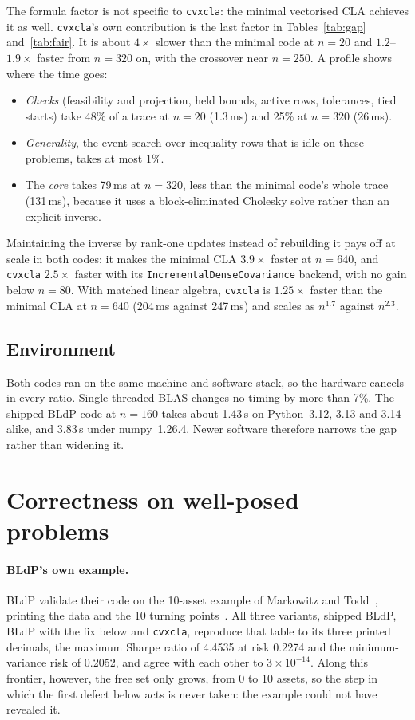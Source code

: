 \documentclass[11pt,a4paper]{article}
\newcommand{\code}[1]{\texttt{#1}}
\newcommand{\cvxcla}{\code{cvxcla}}
\begin{document}
The formula factor is not specific to \cvxcla{}: the minimal vectorised CLA
achieves it as well. \cvxcla{}'s own contribution is the last factor in
Tables~\ref{tab:gap} and~\ref{tab:fair}. It is about $4\times$ slower than the
minimal code at $n = 20$ and $1.2$--$1.9\times$ faster from $n = 320$ on, with
the crossover near $n = 250$. A profile shows where the time goes:

\begin{itemize}
  \item \emph{Checks} (feasibility and projection, held bounds, active rows,
    tolerances, tied starts) take 48\% of a trace at $n = 20$ (1.3\,ms) and
    25\% at $n = 320$ (26\,ms).
  \item \emph{Generality}, the event search over inequality rows that is idle
    on these problems, takes at most 1\%.
  \item The \emph{core} takes 79\,ms at $n = 320$, less than the minimal
    code's whole trace (131\,ms), because it uses a block-eliminated Cholesky
    solve rather than an explicit inverse.
\end{itemize}

Maintaining the inverse by rank-one updates instead of rebuilding it pays off
at scale in both codes: it makes the minimal CLA $3.9\times$ faster at
$n = 640$, and \cvxcla{} $2.5\times$ faster with its
\code{IncrementalDenseCovariance} backend, with no gain below $n = 80$. With
matched linear algebra, \cvxcla{} is $1.25\times$ faster than the minimal CLA
at $n = 640$ (204\,ms against 247\,ms) and scales as $n^{1.7}$ against
$n^{2.3}$.

\subsection{Environment}

Both codes ran on the same machine and software stack, so the hardware cancels
in every ratio. Single-threaded BLAS changes no timing by more than 7\%. The
shipped BLdP code at $n = 160$ takes about 1.43\,s on Python~3.12, 3.13 and
3.14 alike, and 3.83\,s under numpy~1.26.4. Newer software therefore narrows
the gap rather than widening it.

\section{Correctness on well-posed problems}\label{sec:correctness}

\paragraph{BLdP's own example.} BLdP validate their code on the 10-asset
example of Markowitz and Todd~\cite{markowitz2000}, printing the data and the
10 turning points~\cite[Tables~1--2]{bailey2013}. All three variants, shipped
BLdP, BLdP with the fix below and \cvxcla{}, reproduce that table to its three
printed decimals, the maximum Sharpe ratio of 4.4535 at risk 0.2274 and the
minimum-variance risk of 0.2052, and agree with each other to
$3 \times 10^{-14}$. Along this frontier, however, the free set only grows,
from 0 to 10 assets, so the step in which the first defect below acts is never
taken: the example could not have revealed it.
\end{document}
